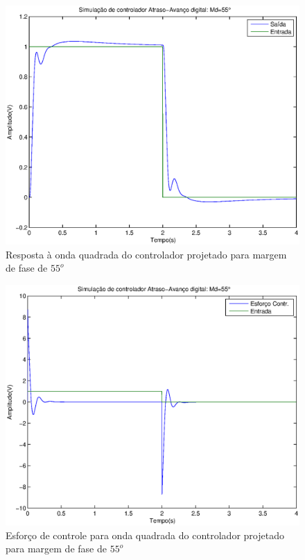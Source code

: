 \documentclass{article}
\begin{document}
\begin{figure}[H]
	\centering
	\includegraphics[width=0.8\linewidth]{yr55}
	\caption{Resposta à onda quadrada do controlador projetado para margem de fase de $55^o$}
	\label{fig:yr55}
\end{figure}
\begin{figure}[H]
	\centering
	\includegraphics[width=0.8\linewidth]{ur55}
	\caption{Esforço de controle para onda quadrada do controlador projetado para margem de fase de $55^o$}
	\label{fig:ur55}
\end{figure}
\end{document}
